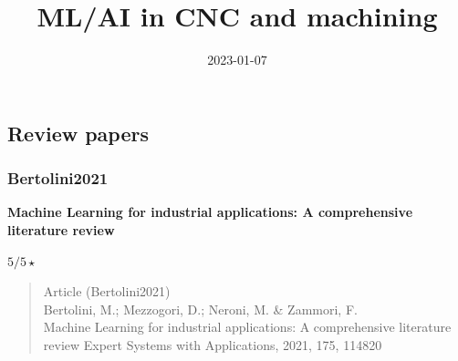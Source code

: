 \documentclass[
  letterpaper,
  DIV=11,
  numbers=noendperiod]{scrartcl}
\title{ML/AI in CNC and machining}
\author{}
\date{2023-01-07}
\renewcommand*\contentsname{Table of contents}
\newcommand\contentsname{Table of contents}
\begin{document}
\maketitle
\ifdefined\Shaded\renewenvironment{Shaded}{\begin{tcolorbox}[breakable, boxrule=0pt, borderline west={3pt}{0pt}{shadecolor}, sharp corners, enhanced, frame hidden, interior hidden]}{\end{tcolorbox}}\fi

\renewcommand*\contentsname{Table of contents}
{
\hypersetup{linkcolor=}
\setcounter{tocdepth}{3}
\tableofcontents
}
\hypertarget{review-papers}{%
\subsection{Review papers}\label{review-papers}}

\hypertarget{bertolini2021}{%
\subsubsection{Bertolini2021}\label{bertolini2021}}

\textbf{Machine Learning for industrial applications: A comprehensive
literature review}

\(5/5 \star\)

\begin{quote}
Article (Bertolini2021)\\
Bertolini, M.; Mezzogori, D.; Neroni, M. \& Zammori, F.\\
Machine Learning for industrial applications: A comprehensive literature
review Expert Systems with Applications, 2021, 175, 114820
\end{quote}
\end{document}
